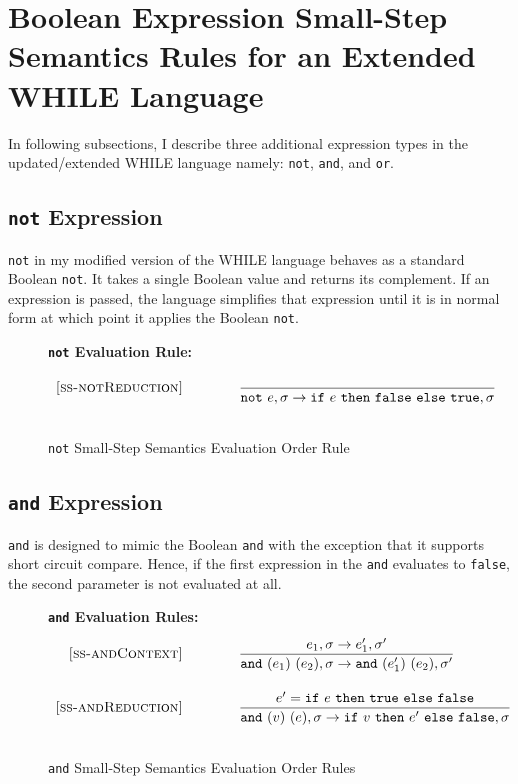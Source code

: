 \documentclass{article}
\newcommand{\ife}[3]{\mbox{\tt if}~{#1}~\mbox{\tt then}~{#2}~\mbox{\tt else}~{#3}}
\newcommand{\note}[1]{\mbox{\tt not}~#1}
\newcommand{\ande}[2]{\mbox{\tt and}~(#1)~(#2)}
\newcommand{\true}{\mbox{\tt true}}
\newcommand{\false}{\mbox{\tt false}}
\begin{document}
\section{Boolean Expression Small-Step Semantics Rules for an Extended WHILE Language}


In following subsections, I describe three additional expression types in the updated/extended WHILE language namely: {\tt not}, {\tt and}, and {\tt or}.  

\subsection{{\tt not} Expression}\label{subSec:not}

{\tt not} in my modified version of the WHILE language behaves as a standard Boolean {\tt not}.  It takes a single Boolean value and returns its complement.  If an expression is passed, the language simplifies that expression until it is in normal form at which point it applies the Boolean {\tt not}.

\begin{figure}[H]
\caption{{\tt not} Small-Step Semantics Evaluation Order Rule}
\label{fig:notRules}
{\bf {\tt not} Evaluation Rule:} 
\[
\\
\begin{array}{r@{\qquad\qquad}l}
\ssrule{ss-notReduction}{
}{
  \sstep{\note{e}}{\sigma}{\ife{e}{\false}{\true}}{\sigma}
}
\end{array}
\]
\end{figure}

\subsection{{\tt and} Expression}\label{subSec:and}

{\tt and} is designed to mimic the Boolean {\tt and} with the exception that it supports short circuit compare.  Hence, if the first expression in the {\tt and} evaluates to {\false}, the second parameter is not evaluated at all.

\begin{figure}[H]
\caption{{\tt and} Small-Step Semantics Evaluation Order Rules}
\label{fig:andRules}
{\bf {\tt and} Evaluation Rules:}
\[
\\
\begin{array}{r@{\qquad\qquad}l}
\ssrule{ss-andContext}{
  \sstep{e_1}{\sigma}{e_1'}{\sigma'}
}{
  \sstep{\ande{e_1}{e_2}}{\sigma}{\ande{e_1'}{e_2}}{\sigma'}
}
\ssrule{ss-andReduction}{
e'=\ife{e}{\true}{\false}
}{
  \sstep{\ande{v}{e}}{\sigma}{\ife{v}{e'}{\false}}{\sigma}
}
\end{array}
\]
\end{figure}
\end{document}

